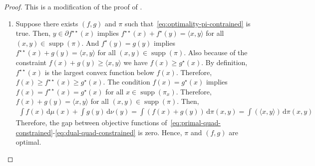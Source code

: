 \documentclass[10pt]{article}
\newcommand{\ud}{\,\mathrm{d}}
\newcommand{\op}[1]{\operatorname{#1}}
\numberwithin{equation}{section}
\begin{document}
\begin{proof}
This is a modification of the proof of \cite[Theorem 2.12]{villani2003topics}.
	\begin{enumerate}
		\item Suppose there exists $(f,g)$ and $\pi$ such that~\eqref{eq:optimality-pi-contrained} is true. Then, $y \in \partial f^{\star\star}(x)$ implies $f^{\star\star}(x) + f^{\star}(y)=\langle x, y\rangle$ for all $(x,y) \in \op{supp}(\pi)$. And $f^\star(y)=g(y)$ implies $f^{\star\star}(x) + g(y)=\langle x, y\rangle$ for all $(x,y) \in \op{supp}(\pi)$. Also because of the constraint $f(x)+g(y) \geq \langle x, y\rangle$ we have $f(x)\geq g^\star(x)$. By definition, $f^{\star\star}(x)$ is the largest convex function below $f(x)$. Therefore, $f(x)\geq f^{\star\star}(x)\geq g^\star(x)$. The condition $f(x)=g^\star(x)$ implies $f(x)=f^{\star\star}(x)= g^\star(x)$ for all $x \in \op{supp}(\pi_x)$. Therefore, $f(x)+g(y) = \langle x, y\rangle$ for all $(x,y) \in \op{supp}(\pi)$. Then,
		\begin{align*}
		\int f(x)\ud \mu(x) + \int g(y) \ud \nu(y) = \int (f(x) + g(y)) \ud \pi(x,y) = \int (\langle x, y\rangle)\ud \pi(x,y)
		\end{align*} 
		Therefore, the gap between objective functions of~\eqref{eq:primal-quad-constrained}-\eqref{eq:dual-quad-constrained} is zero. Hence, $\pi$ and $(f,g)$ are optimal.
		

\end{enumerate}
\end{proof}
\end{document}
